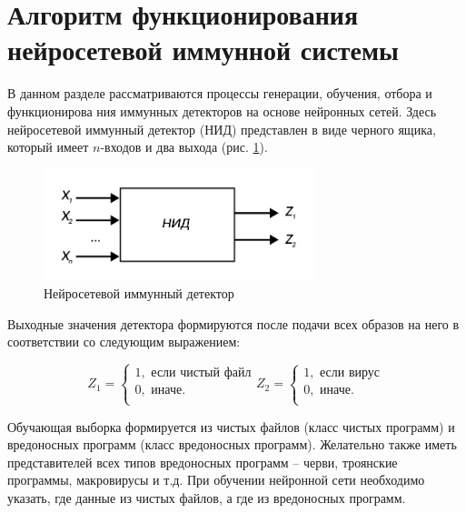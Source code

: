 \documentclass[bachelor, och, referat]{template}
\begin{document}

\section{Алгоритм функционирования нейросетевой иммунной системы}

В данном разделе рассматриваются процессы генерации, обучения, отбора и функционирова­
ния иммунных детекторов на основе нейронных сетей. Здесь 
нейросетевой иммунный детектор (НИД) представлен в виде черного ящика, который
имеет $n$-входов и два выхода (рис. \ref{nid}).

\begin{figure}[H]
    \centering
    \includegraphics[width=0.7\textwidth]{pics/nid.png}
    \caption{Нейросетевой иммунный детектор}
    \label{nid}
\end{figure} 

Выходные значения детектора формируются после подачи всех
образов на него в соответствии со следующим выражением:

\begin{equation}
    Z_1 =
    \begin{cases}
        1, \text{ если чистый файл} \\
        0, \text{ иначе.} \\
    \end{cases}
    Z_2 =
    \begin{cases}
        1, \text{ если вирус} \\
        0, \text{ иначе.} \\
    \end{cases}
    \label{eq1}
\end{equation}

Обучающая выборка формируется из чистых файлов (класс чистых
программ) и вредоносных программ (класс вредоносных программ). Желательно 
также иметь представителей всех типов вредоносных программ -- черви, 
троянские программы, макровирусы и т.д. При обуче­нии нейронной сети
необходимо указать, где данные из чистых файлов, а где из
вредоносных программ.
\end{document}
